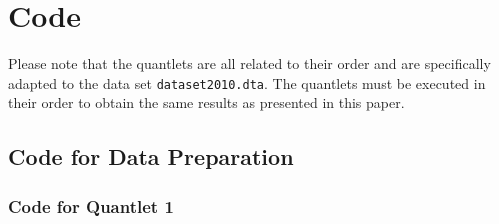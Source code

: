 \section{Code}

Please note that the quantlets are all related to their order and are specifically adapted to the data set \texttt{dataset2010.dta}. The quantlets must be executed in their order to obtain the same results as presented in this paper.


\subsection{Code for Data Preparation}

\subsubsection{Code for Quantlet 1}
\lstset{firstnumber = 1}
